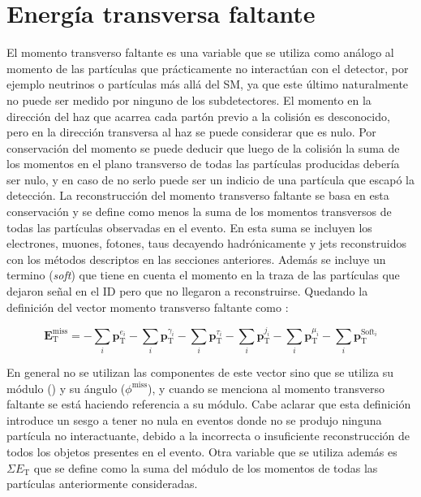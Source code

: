 \section{Energía transversa faltante}\label{sec:met}


El momento transverso faltante es una variable que se utiliza como análogo al momento de las partículas que prácticamente no interactúan con el detector, por ejemplo neutrinos o partículas más allá del SM, ya que este último naturalmente no puede ser medido por ninguno de los subdetectores. El momento en la dirección del haz que acarrea cada partón previo a la colisión es desconocido, pero en la dirección transversa al haz se puede considerar que es nulo. Por conservación del momento se puede deducir que luego de la colisión la suma de los momentos en el plano transverso de todas las partículas producidas debería ser nulo, y en caso de no serlo puede ser un indicio de una partícula que escapó la detección. La reconstrucción del momento transverso faltante se basa en esta conservación y se define como menos la suma de los momentos transversos de todas las partículas observadas en el evento. En esta suma se incluyen los electrones, muones, fotones, taus decayendo hadrónicamente y jets reconstruidos con los métodos descriptos en las secciones anteriores. Además se incluye un termino (\textit{soft}) que tiene en cuenta el momento en la traza de las partículas que dejaron señal en el ID pero que no llegaron a reconstruirse. Quedando la definición del vector momento transverso faltante como \cite{PERF-2016-07}:

\begin{equation}
\textbf{E}_{\text{T}}^{\text{miss}} = -\sum_{i}\textbf{p}_{\text{T}}^{e_i}-\sum_{i}\textbf{p}_{\text{T}}^{\gamma_i}-\sum_{i}\textbf{p}_{\text{T}}^{\tau_i}-\sum_{i}\textbf{p}_{\text{T}}^{j_i}-\sum_{i}\textbf{p}_{\text{T}}^{\mu_i}-\sum_{i}\textbf{p}_{\text{T}}^{\text{Soft}_i}
\end{equation}


En general no se utilizan las componentes de este vector sino que se utiliza su módulo (\met) y su ángulo ($\phi^{\text{miss}}$), y cuando se menciona al momento transverso faltante se está haciendo referencia a su módulo. Cabe aclarar que esta definición introduce un sesgo a tener \met no nula en eventos donde no se produjo ninguna partícula no interactuante, debido a la incorrecta o insuficiente reconstrucción de todos los objetos presentes en el evento. Otra variable que se utiliza además es $\Sigma E_{\text{T}}$ que se define como la suma del módulo de los momentos de todas las partículas anteriormente consideradas. 

